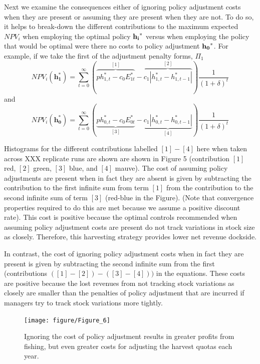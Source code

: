 \documentclass{article}\usepackage{graphicx, color}
\makeatletter
\newenvironment{kframe}{%
 \def\at@end@of@kframe{}%
 \ifinner\ifhmode%
  \def\at@end@of@kframe{\end{minipage}}%
  \begin{minipage}{\columnwidth}%
 \fi\fi%
 \def\FrameCommand##1{\hskip\@totalleftmargin \hskip-\fboxsep
 \colorbox{shadecolor}{##1}\hskip-\fboxsep
     \hskip-\linewidth \hskip-\@totalleftmargin \hskip\columnwidth}%
 \MakeFramed {\advance\hsize-\width
   \@totalleftmargin\z@ \linewidth\hsize
   \@setminipage}}%
 {\par\unskip\endMakeFramed%
 \at@end@of@kframe}
\newenvironment{knitrout}{}{} %
\makeatother
\begin{document}
Next we examine the consequences either of ignoring policy adjustment costs when they are present or assuming they are present when they are not. To do so, it helps to break-down the different contributions to the maximum expected $NPV_i$ when employing the optimal policy $\bf{h_i}^*$ versus when employing the policy that would be optimal were there no costs to policy adjustment $\bf{h_0}^*$. For example, if we take the first of the adjustment penalty forms, $\Pi_1$
\begin{equation}
 NPV_i( \mathbf{h_1^*} ) = \sum_{t=0}^\infty (\overbrace{ p h^*_{1,t}-c_0E^*_{1t}}^{[1]}-\overbrace{c_1 | h^*_{1,t}- h^*_{1,t-1}|}^{[2]} ) \displaystyle \frac{1}{(1+\delta)^t}
\end{equation}
and 
\begin{equation}
 NPV_i( \mathbf{h_0^*} ) = \sum_{t=0}^\infty (\underbrace{ p h^*_{0,t}-c_0E^*_{0t}}_{[3]}-\underbrace{c_1 | h^*_{0,t}- h^*_{0,t-1}|}_{[4]} ) \displaystyle \frac{1}{(1+\delta)^t}
\end{equation}

Histograms for the different contributions labelled $[1]-[4]$ here when taken across XXX replicate runs are shown are shown in Figure 5 (contribution $[1]$ red, $[2]$ green, $[3]$ blue, and $[4]$ mauve). The cost of assuming policy adjustments are present when in fact they are absent is given by subtracting the contribution to the first infinite sum from term $[1]$ from the contribution to the second infinite sum of term $[3]$ (red-blue in the Figure). (Note that convergence properties required to do this are met because we assume a positive discount rate). This cost is positive because the optimal controls recommended when assuming policy adjustment costs are present do not track variations in stock size as closely. Therefore, this harvesting strategy provides lower net revenue dockside.

In contrast, the cost of ignoring policy adjustment costs when in fact they are present is given by subtracting the second infinite sum from the first (contributions $([1]-[2])-([3]-[4]))$ in the equations. These costs are positive because the lost revenues from not tracking stock variations as closely are smaller than the penalties of policy adjustment that are incurred if managers try to track stock variations more tightly.

\begin{figure}
\begin{knitrout}
\color{fgcolor}\begin{kframe}


{\ttfamily\noindent\itshape\color{messagecolor}{\#\# Using\ \ as id variables}}\end{kframe}
\texttt{[image: figure/Figure\_6]} 

\end{knitrout}


\caption{Ignoring the cost of policy adjustment results in greater profits from fishing, but even greater costs for adjusting the harvest quotas each year.}
\end{figure}
\end{document}
